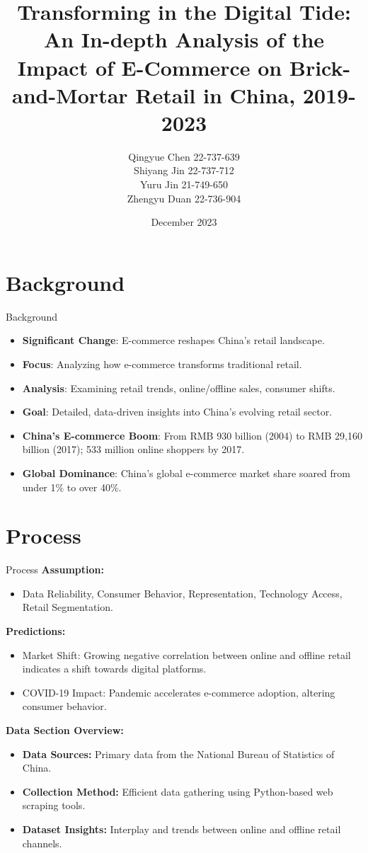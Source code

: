 \documentclass{beamer}
\title[Ecommerce-affecting-brickandmortar-retail] %
{Transforming in the Digital Tide: An In-depth Analysis of the Impact of E-Commerce on Brick-and-Mortar Retail in China, 2019-2023}
\author{Qingyue Chen 22-737-639\\Shiyang Jin 22-737-712\\
Yuru Jin 21-749-650\\Zhengyu Duan 22-736-904}
\date[11-12-2023] %
{December 2023}
\begin{document}
\frame{\titlepage}




\section{Background}



\begin{frame}{Background}
  \begin{itemize}
    \item \textbf{Significant Change}: E-commerce reshapes China's retail landscape.
    \item \textbf{Focus}: Analyzing how e-commerce transforms traditional retail.
    \item \textbf{Analysis}: Examining retail trends, online/offline sales, consumer shifts.
    \item \textbf{Goal}: Detailed, data-driven insights into China's evolving retail sector.
    \item \textbf{China's E-commerce Boom}: From RMB 930 billion (2004) to RMB 29,160 billion (2017); 533 million online shoppers by 2017.
    \item \textbf{Global Dominance}: China's global e-commerce market share soared from under 1\% to over 40\%.
  \end{itemize}
\end{frame}

\section{Process}
\begin{frame}{Process}
  \textbf{Assumption:} 
  \begin{itemize}
    \item Data Reliability, Consumer Behavior, Representation, Technology Access, Retail Segmentation.
  \end{itemize}

  \textbf{Predictions:}
  \begin{itemize}
    \item Market Shift: Growing negative correlation between online and offline retail indicates a shift towards digital platforms.
    \item COVID-19 Impact: Pandemic accelerates e-commerce adoption, altering consumer behavior.
  \end{itemize}

  \textbf{Data Section Overview:}
  \begin{itemize}
    \item \textbf{Data Sources:} Primary data from the National Bureau of Statistics of China.
    \item \textbf{Collection Method:} Efficient data gathering using Python-based web scraping tools.
    \item \textbf{Dataset Insights:} Interplay and trends between online and offline retail channels.
  \end{itemize}
\end{frame}
\end{document}
